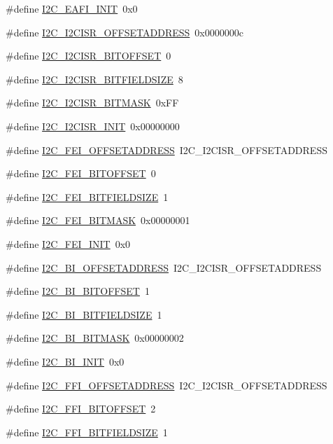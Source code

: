 \begin{DoxyCompactItemize}
\#define \hyperlink{a00558_a3dea330274846425ce62f8f8fef61329}{I2C\_\-EAFI\_\-INIT}~0x0
\item 
\#define \hyperlink{a00558_a25ab6eec51f63cc743a9e75a0993bea5}{I2C\_\-I2CISR\_\-OFFSETADDRESS}~0x0000000c
\item 
\#define \hyperlink{a00558_a0e2c77ccfccd6d7e9c617cc868c12c23}{I2C\_\-I2CISR\_\-BITOFFSET}~0
\item 
\#define \hyperlink{a00558_a488de08445809b9a505618173219c6d7}{I2C\_\-I2CISR\_\-BITFIELDSIZE}~8
\item 
\#define \hyperlink{a00558_aedea73401ef26408a227607b854309ce}{I2C\_\-I2CISR\_\-BITMASK}~0xFF
\item 
\#define \hyperlink{a00558_a284d29d73a13300383717e8333a71cd0}{I2C\_\-I2CISR\_\-INIT}~0x00000000
\item 
\#define \hyperlink{a00558_ad2731c220555c15d73aa57cfead6bac7}{I2C\_\-FEI\_\-OFFSETADDRESS}~I2C\_\-I2CISR\_\-OFFSETADDRESS
\item 
\#define \hyperlink{a00558_afeb33abd8f316d77f5e182815019877b}{I2C\_\-FEI\_\-BITOFFSET}~0
\item 
\#define \hyperlink{a00558_a08430c3a9c0e3acf882b942bd2dc0a44}{I2C\_\-FEI\_\-BITFIELDSIZE}~1
\item 
\#define \hyperlink{a00558_a826bcc0dbd1ca1ab559ed81876a020fd}{I2C\_\-FEI\_\-BITMASK}~0x00000001
\item 
\#define \hyperlink{a00558_a74e1bb2b9eabe13cf6d7d108f71e6a1b}{I2C\_\-FEI\_\-INIT}~0x0
\item 
\#define \hyperlink{a00558_aff3b8a6a65e0e531fd4ebe376b1fed84}{I2C\_\-BI\_\-OFFSETADDRESS}~I2C\_\-I2CISR\_\-OFFSETADDRESS
\item 
\#define \hyperlink{a00558_a4349b39bdf8b905eb7a83d14004a33fc}{I2C\_\-BI\_\-BITOFFSET}~1
\item 
\#define \hyperlink{a00558_a3c770f04796e15aad73e7b9a4c3d6a32}{I2C\_\-BI\_\-BITFIELDSIZE}~1
\item 
\#define \hyperlink{a00558_af2b392a3c09233c07cabf05a082ef0ea}{I2C\_\-BI\_\-BITMASK}~0x00000002
\item 
\#define \hyperlink{a00558_acb78c07404e9d15d281c95c99b40d4f4}{I2C\_\-BI\_\-INIT}~0x0
\item 
\#define \hyperlink{a00558_acad7fae52d1312ade243d8cf25820b5a}{I2C\_\-FFI\_\-OFFSETADDRESS}~I2C\_\-I2CISR\_\-OFFSETADDRESS
\item 
\#define \hyperlink{a00558_aa67256b0e79f47bda31688c7c59dc25c}{I2C\_\-FFI\_\-BITOFFSET}~2
\item 
\#define \hyperlink{a00558_a215ce7e108aa687b63c4815c915b7e15}{I2C\_\-FFI\_\-BITFIELDSIZE}~1

\end{DoxyCompactItemize}
